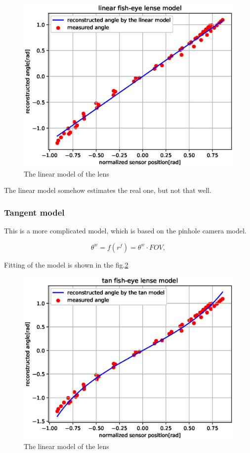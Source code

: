 \documentclass[a4paper,12pt,titlepage, twoside]{article}
\numberwithin{figure}{section}
\begin{document}
\begin{figure}[h!]
\centering
\includegraphics[width=1\linewidth]{fig/linear_model3.eps}
\caption{The linear model of the lens}
\label{fig:linear_model}
\end{figure}

The linear model somehow estimates the real one, but not that well.

\subsubsection{Tangent model}

This is a more complicated model, which is based on the pinhole camera model.

\begin{equation}
\theta^w = f(r^f) = \theta^w \cdot FOV,
\end{equation}

Fitting of the model is shown in the fig.\ref{fig:linear_model}

\begin{figure}[h!]
\centering
\includegraphics[width=1\linewidth]{fig/tan_model2.eps}
\caption{The linear model of the lens}
\label{fig:linear_model}
\end{figure}
\end{document}
